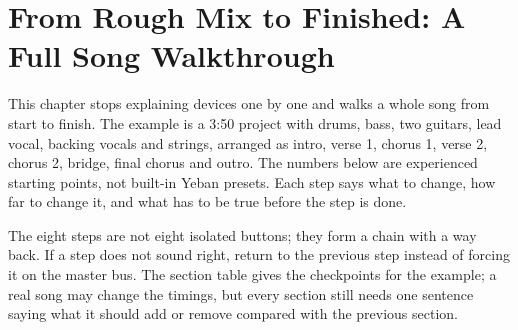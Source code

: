 \chapter{From Rough Mix to Finished: A Full Song Walkthrough}
\label{chap:rough-to-finished}


This chapter stops explaining devices one by one and walks a whole song from start to finish. The example is a 3:50 project with drums, bass, two guitars, lead vocal, backing vocals and strings, arranged as intro, verse 1, chorus 1, verse 2, chorus 2, bridge, final chorus and outro. The numbers below are experienced starting points, not built-in Yeban presets. Each step says what to change, how far to change it, and what has to be true before the step is done.

\begin{center}
\end{center}

The eight steps are not eight isolated buttons; they form a chain with a way back. If a step does not sound right, return to the previous step instead of forcing it on the master bus. The section table gives the checkpoints for the example; a real song may change the timings, but every section still needs one sentence saying what it should add or remove compared with the previous section.

